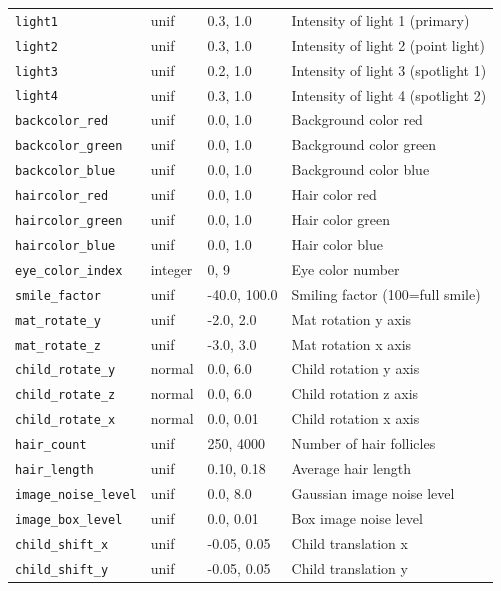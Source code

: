 \documentclass{article}
\begin{document}
\begin{table}[h]
{\begin{tabular}{|l|l|l|l|}
    \texttt{light1} & unif & 0.3, 1.0 & Intensity of light 1 (primary) \\ 
    \texttt{light2} & unif & 0.3, 1.0 & Intensity of light 2 (point light) \\ 
    \texttt{light3} & unif & 0.2, 1.0 & Intensity of light 3 (spotlight 1) \\
    \texttt{light4} & unif & 0.3, 1.0 & Intensity of light 4 (spotlight 2) \\ 
    \texttt{backcolor\_red} & unif & 0.0, 1.0 & Background color red \\ 
    \texttt{backcolor\_green} & unif & 0.0, 1.0 &  Background color green\\ 
    \texttt{backcolor\_blue} & unif & 0.0, 1.0 & Background color blue \\ 
    \texttt{haircolor\_red} & unif & 0.0, 1.0 &  Hair color red\\ 
    \texttt{haircolor\_green} & unif & 0.0, 1.0 & Hair color green \\ 
    \texttt{haircolor\_blue} & unif & 0.0, 1.0 & Hair color blue \\ 
    \texttt{eye\_color\_index} & integer & 0, 9 & Eye color number \\ 
    \texttt{smile\_factor} & unif & -40.0, 100.0 & Smiling factor (100=full smile) \\ 
    \texttt{mat\_rotate\_y} & unif & -2.0, 2.0 & Mat rotation y axis \\ 
    \texttt{mat\_rotate\_z} & unif & -3.0, 3.0 & Mat rotation x axis \\ 
    \texttt{child\_rotate\_y} & normal & 0.0, 6.0 & Child rotation y axis \\ 
    \texttt{child\_rotate\_z} & normal & 0.0, 6.0 & Child rotation z axis \\ 
    \texttt{child\_rotate\_x} & normal & 0.0, 0.01 & Child rotation x axis \\ 
    \texttt{hair\_count} & unif & 250, 4000 & Number of hair follicles \\
    \texttt{hair\_length} & unif & 0.10, 0.18 & Average hair length \\ 
    \texttt{image\_noise\_level} & unif & 0.0, 8.0 & Gaussian image noise level\\ 
    \texttt{image\_box\_level} & unif & 0.0, 0.01 & Box image noise level \\
    \texttt{child\_shift\_x} & unif & -0.05, 0.05 & Child translation x\\
    \texttt{child\_shift\_y} & unif & -0.05, 0.05 & Child translation y\\

\end{tabular}}
\end{table}
\end{document}
